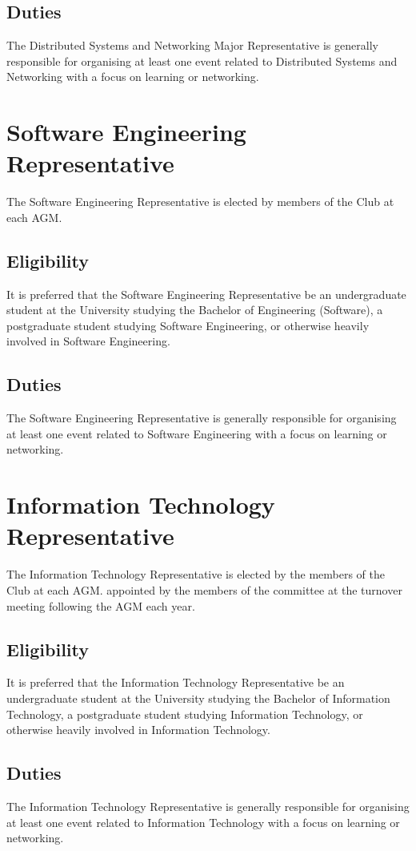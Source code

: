 \documentclass[11pt]{article}
\begin{document}
\subsection{Duties}
The Distributed Systems and Networking Major Representative is generally responsible for organising at least one event related to Distributed Systems and Networking with a focus on learning or networking.

\section{Software Engineering Representative}
The Software Engineering Representative is elected by members of the Club at each AGM. 
\subsection{Eligibility}
It is preferred that the Software Engineering Representative be an undergraduate student at the University studying the Bachelor of Engineering (Software), a postgraduate student studying Software Engineering, or otherwise heavily involved in Software Engineering.
\subsection{Duties}
The Software Engineering Representative is generally responsible for organising at least one event related to Software Engineering with a focus on learning or networking.

\section{Information Technology Representative}
The Information Technology Representative is elected by the members of the Club at each AGM. appointed by the members of the committee at the turnover meeting following the AGM each year.
\subsection{Eligibility}
It is preferred that the Information Technology Representative be an undergraduate student at the University studying the Bachelor of Information Technology, a postgraduate student studying Information Technology, or otherwise heavily involved in Information Technology.
\subsection{Duties}
The Information Technology Representative is generally responsible for organising at least one event related to Information Technology with a focus on learning or networking.
\end{document}
